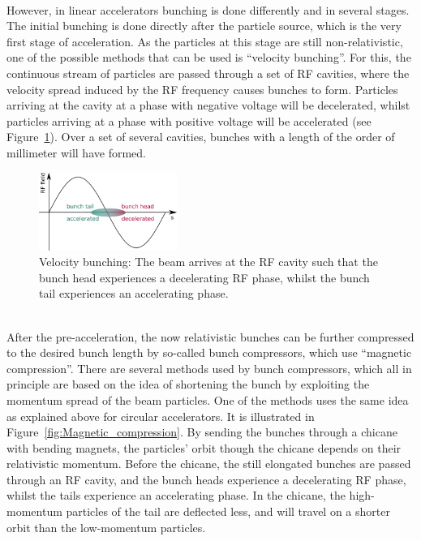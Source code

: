 \\However, in linear accelerators bunching is done differently and in several stages.
The initial bunching is done directly after the particle source, which is the very first stage of acceleration.
As the particles at this stage are still non-relativistic, one of the possible methods that can be used is ``velocity bunching''.
For this, the continuous stream of particles are passed through a set of RF cavities, where the velocity spread induced by the RF frequency causes bunches to form.
Particles arriving at the cavity at a phase with negative voltage will be decelerated, whilst particles arriving at a phase with positive voltage will be accelerated (see Figure~\ref{fig:Velocity_bunching}).
Over a set of several cavities, bunches with a length of the order of millimeter will have formed.
\begin{figure}
\centering
\includegraphics[width=0.4\textwidth]{Figures/Velocity_bunching.png}
\caption[Velocity bunching]{Velocity bunching: The beam arrives at the RF cavity such that the bunch head experiences a decelerating RF phase, whilst the bunch tail experiences an accelerating phase.}
\label{fig:Velocity_bunching}
\end{figure}
\\After the pre-acceleration, the now relativistic bunches can be further compressed to the desired bunch length by so-called bunch compressors, which use ``magnetic compression''.
There are several methods used by bunch compressors, which all in principle are based on the idea of shortening the bunch by exploiting the momentum spread of the beam particles.
One of the methods uses the same idea as explained above for circular accelerators.
It is illustrated in Figure~\ref{fig:Magnetic_compression}.
By sending the bunches through a chicane with bending magnets, the particles' orbit though the chicane depends on their relativistic momentum.
Before the chicane, the still elongated bunches are passed through an RF cavity, and the bunch heads experience a decelerating RF phase, whilst the tails experience an accelerating phase.
In the chicane, the high-momentum particles of the tail are deflected less, and will travel on a shorter orbit than the low-momentum particles.
